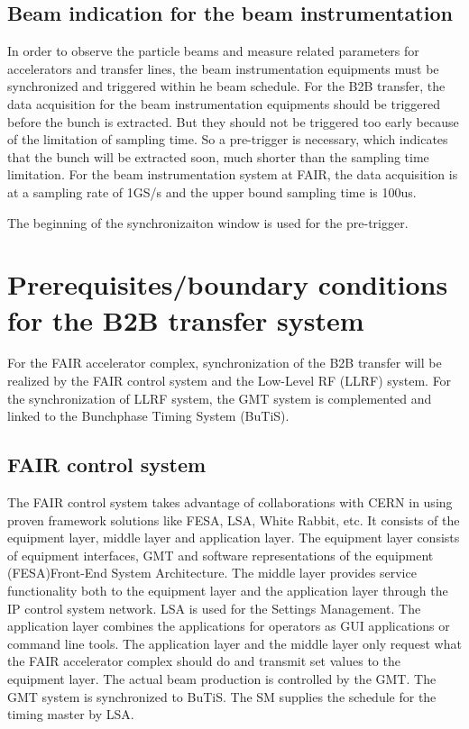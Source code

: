\subsection{Beam indication for the beam instrumentation}
In order to observe the particle beams and measure related parameters for accelerators and transfer lines, the beam instrumentation equipments must be synchronized and triggered within he beam schedule. For the B2B transfer, the data acquisition for the beam instrumentation equipments should be triggered before the bunch is extracted. But they should not be triggered too early because of the limitation of sampling time. So a pre-trigger is necessary, which indicates that the bunch will be extracted soon, much shorter than the sampling time limitation. For the beam instrumentation system at FAIR, the data acquisition is at a sampling rate of 1GS/s and the upper bound sampling time is 100us. 

The beginning of the synchronizaiton window is used for the pre-trigger. 

\section{Prerequisites/boundary conditions for the B2B transfer system}
For the FAIR accelerator complex, synchronization of the B2B transfer will be
realized by the FAIR control system and the Low-Level RF
(LLRF) system. For the synchronization of LLRF system, the GMT system is complemented and linked to the Bunchphase Timing System (BuTiS). 
\subsection{FAIR control system}
The FAIR control system takes advantage of collaborations with CERN in using proven framework solutions like FESA, LSA, White Rabbit, etc. It consists of the equipment layer, middle layer and application layer. The equipment layer consists of equipment interfaces, GMT and software representations of the equipment
(FESA)Front-End System Architecture. The middle layer provides service functionality both to the equipment layer and the application layer through the IP control system network. LSA is used for the Settings Management. The application layer combines the applications for operators as GUI applications or command line tools. The application layer and the middle layer only request what the FAIR accelerator complex should do and transmit set values to the equipment layer. The actual beam production is controlled by the GMT. The GMT system is synchronized to BuTiS. The SM supplies the schedule for the timing master by LSA.

